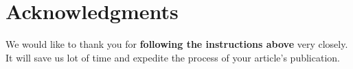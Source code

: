 \documentclass{aims} %
\theoremstyle{definition}
\begin{document}
\section*{Acknowledgments}
We would like to thank you for \textbf{following
the instructions above} very closely. It will save us lot of time and expedite the
process of your article's publication.









\end{document}
